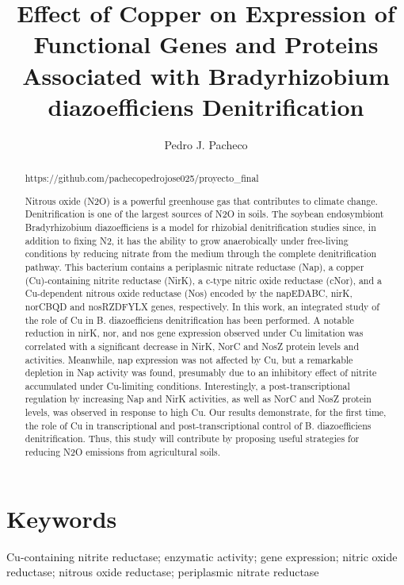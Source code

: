 \documentclass[12pt]{article}
\title{\textbf{Effect of Copper on Expression of Functional Genes
and Proteins Associated with Bradyrhizobium
diazoefficiens Denitrification}}
\author{Pedro J. Pacheco}
\date{}
\begin{document}
\maketitle
\begin{abstract}
https://github.com/pachecopedrojose025/proyecto_final

Nitrous oxide (N2O) is a powerful greenhouse gas that contributes to climate change.
Denitrification is one of the largest sources of N2O in soils. The soybean endosymbiont Bradyrhizobium
diazoefficiens is a model for rhizobial denitrification studies since, in addition to fixing N2, it has
the ability to grow anaerobically under free-living conditions by reducing nitrate from the medium
through the complete denitrification pathway. This bacterium contains a periplasmic nitrate reductase
(Nap), a copper (Cu)-containing nitrite reductase (NirK), a c-type nitric oxide reductase (cNor), and
a Cu-dependent nitrous oxide reductase (Nos) encoded by the napEDABC, nirK, norCBQD and
nosRZDFYLX genes, respectively. In this work, an integrated study of the role of Cu in B. diazoefficiens
denitrification has been performed. A notable reduction in nirK, nor, and nos gene expression observed
under Cu limitation was correlated with a significant decrease in NirK, NorC and NosZ protein levels
and activities. Meanwhile, nap expression was not affected by Cu, but a remarkable depletion in Nap
activity was found, presumably due to an inhibitory effect of nitrite accumulated under Cu-limiting
conditions. Interestingly, a post-transcriptional regulation by increasing Nap and NirK activities, as
well as NorC and NosZ protein levels, was observed in response to high Cu. Our results demonstrate,
for the first time, the role of Cu in transcriptional and post-transcriptional control of B. diazoefficiens
denitrification. Thus, this study will contribute by proposing useful strategies for reducing N2O
emissions from agricultural soils.
\end{abstract}

\section*{Keywords}
Cu-containing nitrite reductase; enzymatic activity; gene expression; nitric oxide
reductase; nitrous oxide reductase; periplasmic nitrate reductase
\end{document}

